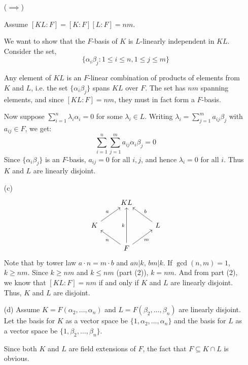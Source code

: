 \documentclass[12pt]{article}
\begin{document}
\begin{solution}
\begin{enumerate}
        ($\implies$)

        Assume $[KL:F] = [K:F][L:F] = nm$. 

        We want to show that the $F$-basis of $K$ is $L$-linearly independent in $KL$. Consider the set,
        \[\{\alpha_i \beta_j : 1 \leq i \leq n, 1 \leq j \leq m\}\]
        
        Any element of $KL$ is an $F$-linear combination of products of elements  from $K$ and $L$, i.e. the set $\{\alpha_i\beta_j\}$ spans $KL$ over $F$.  The set has $nm$ spanning elements, and since $[KL:F] = nm$, they must in fact form a $F$-basis.

        Now suppose $\sum_{i=1}^n \lambda_i \alpha_i = 0$ for some $\lambda_i \in L$. 
        Writing $\lambda_i = \sum_{j=1}^m a_{ij}\beta_j$ with $a_{ij} \in F$, we get:
        \[\sum_{i=1}^n\sum_{j=1}^m a_{ij}\alpha_i\beta_j = 0\]
        Since $\{\alpha_i\beta_j\}$ is an $F$-basis, $a_{ij} = 0$ for all $i,j$, 
        and hence $\lambda_i = 0$ for all $i$. Thus $K$ and $L$ are linearly disjoint. 


        \item[(c)] 
                \[
                \begin{tikzcd}
                & KL & \\
                K \arrow[ur, "a"] & & L \arrow[ul, "b"'] \\
                & F \arrow[ul, "n"] \arrow[ur, "m"'] \arrow[uu, "k"] &
                \end{tikzcd}
                \]
        Note that by tower law $a\cdot n = m \cdot b$ and $an | k$, $bm |k$. If $\gcd(n,m) =1$, $k \geq nm$. Since $k \geq nm$ and $k \leq nm$ (part (2)), $k = nm$. And from part (2), we know that $[KL:F] = nm$ if and only if $K$ and $L$ are linearly disjoint. Thus, $K$ and $L$ are disjoint. 

        \item[(d)] Assume $K = F(\alpha_2, \ldots, \alpha_n)$ and $L = F(\beta_2, \ldots, \beta_n)$ are linearly disjoint. Let the basis for $K$ as a vector space be $\{1, \alpha_2, \ldots, \alpha_n\}$ and the basis for $L$ as a vector space be $\{1, \beta_2, \ldots, \beta_n\}$.
        
        Since both $K$ and $L$ are field extensions of $F$, the fact that $F \subseteq K\cap L$ is obvious. 
        

\end{enumerate}
\end{solution}
\end{document}
